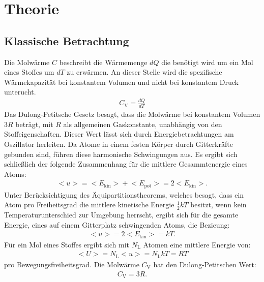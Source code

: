 \section{Theorie}
\label{sec:Theorie}

\cite{sample}
\subsection{Klassische Betrachtung}
Die Molwärme $C$ beschreibt die Wärmemenge $dQ$
die benötigt wird um ein Mol eines Stoffes um $dT$ zu erwärmen.
An dieser Stelle wird die spezifische Wärmekapazität bei konstantem Volumen und nicht bei
konstantem Druck unterucht.
\begin{align}
  C_{\mathrm{V}}=\frac{dQ}{dT}
\end{align}
Das Dulong-Petitsche Gesetz besagt, dass die Molwärme bei konstantem Volumen
$3R$ beträgt, mit $R$ als allgemeinen Gaskonstante, unabhängig von den Stoffeigenschaften.
Dieser Wert lässt sich durch Energiebetrachtungen am Oszillator herleiten. Da Atome in einem
festen Körper durch Gitterkräfte gebunden sind, führen diese harmonische Schwingungen
aus. Es ergibt sich schließlich der folgende Zusammenhang für die mittlere Gesammtenergie
eines Atoms:
\begin{align}
  \bigl<u\bigr>=\bigl<E_{\mathrm{kin}}\bigr>+\bigl<E_{\mathrm{pot}}\bigr>=2\bigl<E_{\mathrm{kin}}\bigr>.
\end{align}
Unter Berücksichtigung des Äquipartitionstheorems, welches besagt, dass ein Atom
pro Freiheitsgrad die mittlere kinetische Energie $\frac{1}{2}kT$ besitzt,
wenn kein Temperaturunterschied zur Umgebung herrscht, ergibt sich für
die gesamte Energie, eines auf einem Gitterplatz schwingenden Atoms, die Bezieung:
\begin{align}
  \bigl<u\bigr>=2\bigl<E_{\mathrm{kin}}\bigr>=kT.
\end{align}
Für ein Mol eines Stoffes ergibt sich mit $N_\mathrm{L}$ Atomen eine mittlere Energie von:
\begin{align}
  \bigl<U\bigr>=N_{\mathrm{L}}\bigl<u\bigr>=N_{\mathrm{L}}kT=RT
\end{align}
pro Bewegungsfreiheitsgrad.
Die Molwärme $C_{\mathrm{V}}$ hat den Dulong-Petitschen Wert:
\begin{align}
  C_{\mathrm{V}}=3R.
\end{align}\\
